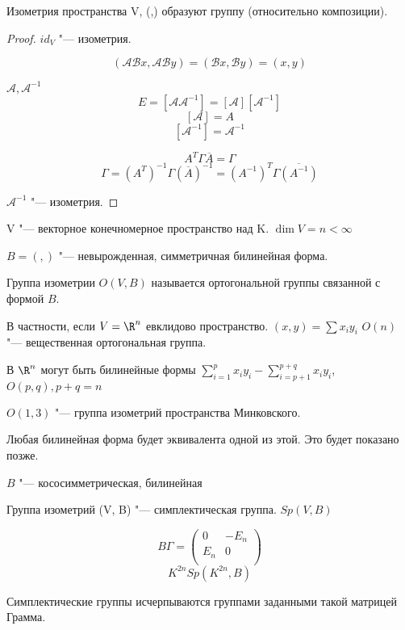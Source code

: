 \begin{conseq}
Изометрия пространства V, (,)
образуют группу (относительно композиции).
\end{conseq}

\begin{proof}
$id_{V}$  "--- изометрия. 

$$(\mathscr{A}\mathscr{B}x, \mathscr{A}\mathscr{B}y) = (\mathscr{B}x, \mathscr{B}y) = (x, y)$$

$\mathscr{A}, \mathscr{A}^{-1}$
$$E = [\mathscr{A}\mathscr{A}^{-1}] = [\mathscr{A}][\mathscr{A}^{-1}]$$
$$[\mathscr{A}] = A$$
$$[\mathscr{A}^{-1}] = \mathscr{A}^{-1}$$

$$A^{T}\Gamma \overline{A} = \Gamma$$
$$\Gamma = (A^T)^{-1} \Gamma (\overline{A})^{-1} = (A^{-1})^{T} \Gamma \overline{(A^{-1})}$$

$\mathscr{A}^{-1}$ "--- изометрия.  
\end{proof}

\begin{Def}
V "--- векторное конечномерное пространство над K. $\dim V = n < \infty$ 

$B = (, )$ "--- невырожденная, симметричная билинейная форма. 

Группа изометрии $O(V, B)$ называется ортогональной группы связанной с формой $B$.

В частности, если $V = \R^n$  евклидово пространство. $(x, y) = \sum x_i y_i$
$O(n)$ "--- вещественная ортогональная группа. 
\end{Def}

В $\R^n$ могут быть билинейные формы $\sum_{i = 1}^{p}x_iy_i - \sum_{i = p + 1}^{p + q} x_i y_i$, $O(p, q), p + q = n$

$O(1, 3)$ "--- группа изометрий пространства Минковского. 

Любая билинейная форма будет эквивалента одной из этой. Это будет показано позже.

\begin{Def}
$B$ "--- кососимметрическая, билинейная

Группа изометрий (V, B) "--- симплектическая группа.
$Sp(V, B)$ 
\end{Def}

\begin{exmp}
$$B \Gamma = \begin{pmatrix} 0& -E_n\\ E_n & 0\\ \end{pmatrix}$$
$$K^{2n} Sp(K^{2n}, B)$$

Симплектические группы исчерпываются группами заданными такой матрицей Грамма. 
\end{exmp}

